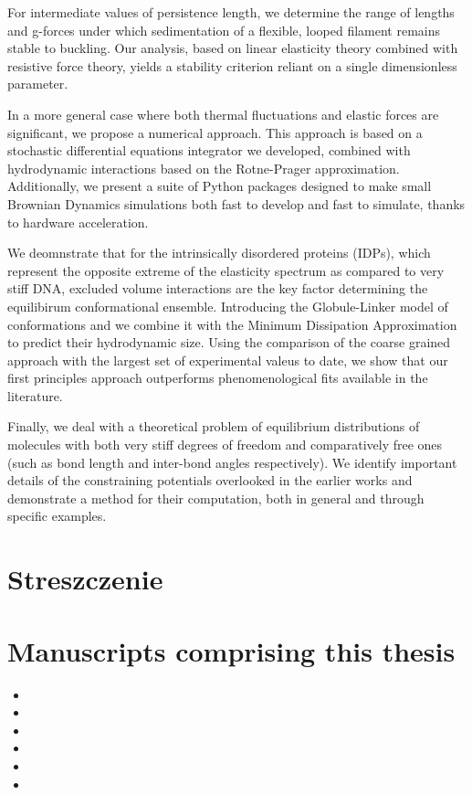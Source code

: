 \documentclass{doctoral}
\begin{document}
For intermediate values of persistence length, we determine the range of lengths and g-forces under which sedimentation of a flexible, looped filament remains stable to buckling.
Our analysis, based on linear elasticity theory combined with resistive force theory, yields a stability criterion reliant on a single dimensionless parameter.

In a more general case where both thermal fluctuations and elastic forces are significant, we propose a numerical approach.
This approach is based on a stochastic differential equations integrator we developed, combined with hydrodynamic interactions based on the Rotne-Prager approximation.
Additionally, we present a suite of Python packages designed to make small Brownian Dynamics simulations both fast to develop and fast to simulate, thanks to hardware acceleration.

We deomnstrate that for the intrinsically disordered proteins (IDPs), which represent the opposite extreme of the elasticity spectrum as compared to very stiff DNA, excluded volume interactions are the key factor determining the equilibirum conformational ensemble.
Introducing the Globule-Linker model of conformations and we combine it with the Minimum Dissipation Approximation to predict their hydrodynamic size.
Using the comparison of the coarse grained approach with the largest set of experimental valeus to date, we show that our first principles approach outperforms phenomenological fits available in the literature.

Finally, we deal with a theoretical problem of equilibrium distributions of molecules with both very stiff degrees of freedom and comparatively free ones (such as bond length and inter-bond angles respectively).
We identify important details of the constraining potentials overlooked in the earlier works and demonstrate a method for their computation, both in general and through specific examples.
\clearpage

\section*{Streszczenie}

\clearpage

\section*{Manuscripts comprising this thesis}

\begin{itemize}
    \item {}
    \item {}
    \item {}
    \item {}
    \item {}
    \item {}
\end{itemize}
\end{document}
